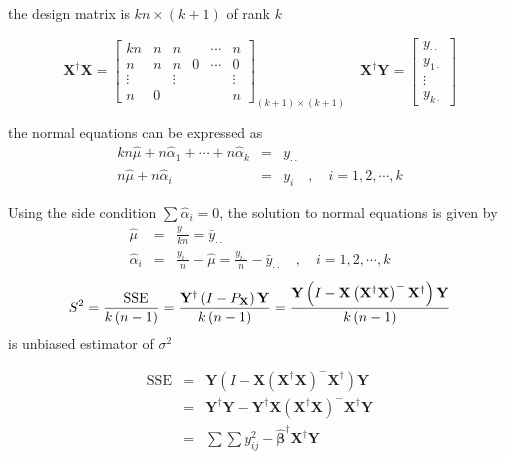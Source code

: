 \documentclass{article}
\begin{document}
the design matrix is $kn\times \left( k+1\right) $ of rank $k$

\begin{equation*}
\mathbf{X}^{\dagger }\mathbf{X}=\left[ 
\begin{array}{cccccc}
kn & n & n &  & \cdots  & n \\ 
n & n & n & 0 & \cdots  & 0 \\ 
\vdots  &  & \vdots  &  &  & \vdots  \\ 
n & 0 &  &  &  & n%
\end{array}%
\right] _{\left( k+1\right) \times \left( k+1\right) }\quad \mathbf{X}%
^{\dagger }\mathbf{Y}=\left[ 
\begin{array}{c}
y_{\cdot \cdot } \\ 
y_{1\cdot } \\ 
\vdots  \\ 
y_{k\cdot }%
\end{array}%
\right] 
\end{equation*}

\bigskip

the normal equations can be expressed as%
\begin{eqnarray*}
kn\hat{\mu}+n\hat{\alpha}_{1}+\cdots +n\hat{\alpha}_{k} &=&y_{\cdot \cdot }
\\
n\hat{\mu}+n\hat{\alpha}_{i} &=&y_{i}\quad ,\quad i=1,2,\cdots ,k
\end{eqnarray*}

Using the side condition $\sum \hat{\alpha}_{i}=0$, the solution to normal
equations is given by%
\begin{eqnarray*}
\hat{\mu} &=&\frac{y_{\cdot \cdot }}{kn}=\bar{y}_{\cdot \cdot } \\
\hat{\alpha}_{i} &=&\frac{y_{i\cdot }}{n}-\hat{\mu}=\frac{y_{i\cdot }}{n}-%
\bar{y}_{\cdot \cdot }\quad ,\quad i=1,2,\cdots ,k
\end{eqnarray*}%
\begin{equation*}
S^{2}=\frac{\text{SSE}}{k\left( n-1\right) }=\frac{\mathbf{Y}^{\dagger
}\left( I-P_{\mathbf{X}}\right) \mathbf{Y}}{k\left( n-1\right) }=\frac{%
\mathbf{Y}\left( I-\mathbf{X}\left( \mathbf{X}^{\dagger }\mathbf{X}\right)
^{-}\mathbf{X}^{\dagger }\right) \mathbf{Y}}{k\left( n-1\right) }
\end{equation*}%
is unbiased estimator of $\sigma ^{2}$

\bigskip 

\begin{eqnarray*}
\text{SSE} &=&\mathbf{Y}\left( I-\mathbf{X}\left( \mathbf{X}^{\dagger }%
\mathbf{X}\right) ^{-}\mathbf{X}^{\dagger }\right) \mathbf{Y} \\
&=&\mathbf{Y}^{\dagger }\mathbf{Y-Y}^{\dagger }\mathbf{X}\left( \mathbf{X}%
^{\dagger }\mathbf{X}\right) ^{-}\mathbf{X}^{\dagger }\mathbf{Y} \\
&=&\sum \sum y_{ij}^{2}-\mathbf{\hat{\beta}}^{\dagger }\mathbf{X}^{\dagger }%
\mathbf{Y}
\end{eqnarray*}
\end{document}
